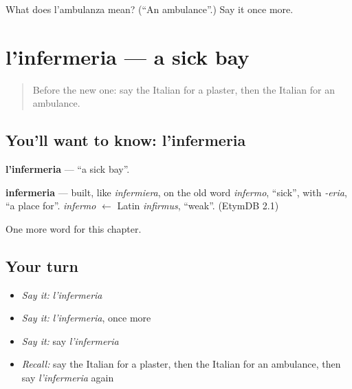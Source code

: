 \begin{tcolorbox}[breakable,colback=teal!4,colframe=teal!35!black,title={Before you move on}]
What does l'ambulanza mean? (\textquotedblleft{}An ambulance\textquotedblright{}.) Say it once more.
\end{tcolorbox}
\section[l'infermeria]{l'infermeria — a sick bay}

\label{lesson:IT-C243-infermeria}



\begin{quote}
Before the new one: say the Italian for a plaster, then the Italian for an ambulance.
\end{quote}

\subsection*{You'll want to know: l'infermeria}
\textbf{l'infermeria} — \textquotedblleft{}a sick bay\textquotedblright{}.

\begin{cousinweb}
\textbf{infermeria} — built, like \emph{infermiera}, on the old word \emph{infermo}, \textquotedblleft{}sick\textquotedblright{}, with \emph{-eria}, \textquotedblleft{}a place for\textquotedblright{}. \emph{infermo} $\leftarrow$ Latin \emph{infirmus}, \textquotedblleft{}weak\textquotedblright{}. (EtymDB 2.1)
\end{cousinweb}

\begin{grammarlens}[title={What you've built}]
One more word for this chapter.
\end{grammarlens}

\subsection*{Your turn}
\begin{itemize}
\raggedright
  \item \emph{Say it:} \emph{l'infermeria}
  \item \emph{Say it:} \emph{l'infermeria}, once more
  \item \emph{Say it:} say \emph{l'infermeria}
  \item \emph{Recall:} say the Italian for a plaster, then the Italian for an ambulance, then say \emph{l'infermeria} again
\end{itemize}

